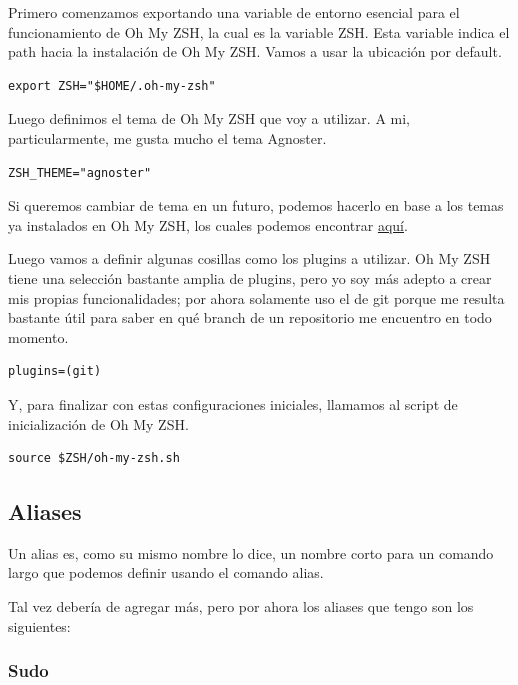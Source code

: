 \documentclass[11pt]{article}
\begin{document}
Primero comenzamos exportando una variable de entorno esencial para el funcionamiento de Oh My ZSH, la cual es la variable ZSH. Esta variable indica el path hacia la instalación de Oh My ZSH. Vamos a usar la ubicación por default.

\begin{verbatim}
export ZSH="$HOME/.oh-my-zsh"
\end{verbatim}

Luego definimos el tema de Oh My ZSH que voy a utilizar. A mi, particularmente, me gusta mucho el tema Agnoster.

\begin{verbatim}
ZSH_THEME="agnoster"
\end{verbatim}

Si queremos cambiar de tema en un futuro, podemos hacerlo en base a los temas ya instalados en Oh My ZSH, los cuales podemos encontrar \href{https://github.com/ohmyzsh/ohmyzsh/wiki/Themes}{aquí}.

Luego vamos a definir algunas cosillas como los plugins a utilizar. Oh My ZSH tiene una selección bastante amplia de plugins, pero yo soy más adepto a crear mis propias funcionalidades; por ahora solamente uso el de git porque me resulta bastante útil para saber en qué branch de un repositorio me encuentro en todo momento.

\begin{verbatim}
plugins=(git)
\end{verbatim}

Y, para finalizar con estas configuraciones iniciales, llamamos al script de inicialización de Oh My ZSH.

\begin{verbatim}
source $ZSH/oh-my-zsh.sh

\end{verbatim}
\subsection{Aliases}
\label{sec:orgcaf3f5a}

Un alias es, como su mismo nombre lo dice, un nombre corto para un comando largo que podemos definir usando el comando alias.

Tal vez debería de agregar más, pero por ahora los aliases que tengo son los siguientes:
\subsubsection{Sudo}
\label{sec:org8423de1}
\end{document}
